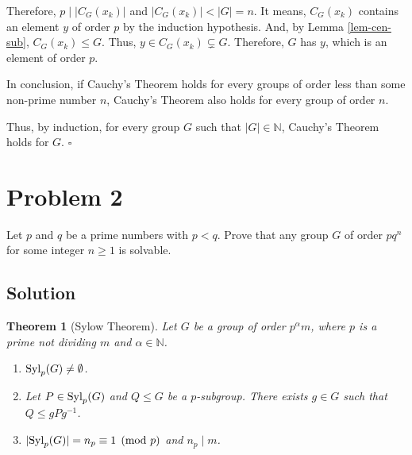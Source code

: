 \documentclass{article}
\newtheorem{theorem}{Theorem}
\newcommand{\qedsq}{\hfill$\square$}
\newcommand{\bbN}{\mathbb{N}}
\newcommand{\Syl}{\textnormal{Syl}}
\begin{document}
Therefore, \(p \mid |C_G(x_k)|\) and \(|C_G(x_k)| < |G| = n\).
It means, \(C_G(x_k)\) contains an element \(y\) of order \(p\) by the induction hypothesis.
And, by Lemma \ref{lem-cen-sub}, \(C_G(x_k) \le G\).
Thus, \(y \in C_G(x_k) \subsetneq G\).
Therefore, \(G\) has \(y\), which is an element of order \(p\).
\newline

\noindent
In conclusion, if Cauchy's Theorem holds for every groups of order less than some non-prime number \(n\), Cauchy's Theorem also holds for every group of order \(n\).
\newline

\noindent
Thus, by induction, for every group \(G\) such that \(|G| \in \bbN\), Cauchy's Theorem holds for \(G\).
\qedsq

\newpage
\section*{Problem 2}
Let \(p\) and \(q\) be a prime numbers with \(p < q\). Prove that any group \(G\) of order \(pq^n\) for some integer \(n \ge 1\) is solvable.

\subsection*{Solution}

\begin{theorem}[Sylow Theorem]
  Let \(G\) be a group of order \(p^\alpha m\), where \(p\) is a prime not dividing \(m\) and \(\alpha \in \bbN\).
\begin{enumerate}[label=(\arabic*)]
\item \(\Syl_p(G) \neq \emptyset\).
\item Let \(P \in \Syl_p(G)\) and \(Q \le G\) be a \(p\)-subgroup. There exists \(g \in G\) such that \(Q \le gPg^{-1}\).
\item \(|\Syl_p(G)| = n_p \equiv 1 \pmod{p}\) and \(n_p \mid m\).
\end{enumerate}
\end{theorem}
\end{document}
